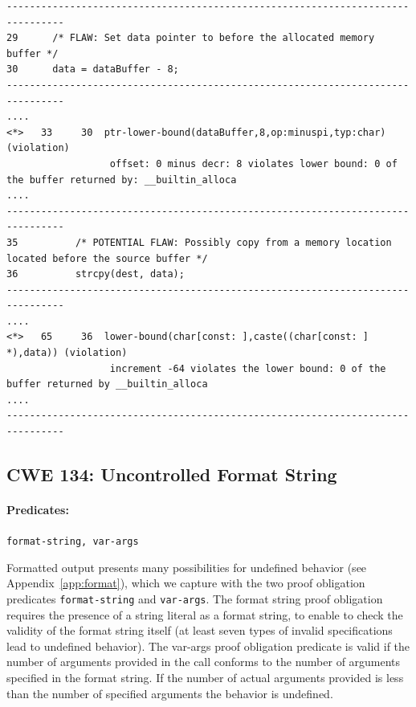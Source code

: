 \documentclass[11pt]{article}
\begin{document}
\begin{tiny}
\begin{verbatim}
--------------------------------------------------------------------------------
29      /* FLAW: Set data pointer to before the allocated memory buffer */
30      data = dataBuffer - 8;
--------------------------------------------------------------------------------
....
<*>   33     30  ptr-lower-bound(dataBuffer,8,op:minuspi,typ:char) (violation)
                  offset: 0 minus decr: 8 violates lower bound: 0 of the buffer returned by: __builtin_alloca
....
--------------------------------------------------------------------------------
35          /* POTENTIAL FLAW: Possibly copy from a memory location located before the source buffer */
36          strcpy(dest, data);
--------------------------------------------------------------------------------
....
<*>   65     36  lower-bound(char[const: ],caste((char[const: ] *),data)) (violation)
                  increment -64 violates the lower bound: 0 of the buffer returned by __builtin_alloca
....
--------------------------------------------------------------------------------
\end{verbatim}
\end{tiny}

\subsection{CWE 134: Uncontrolled Format String}

\paragraph{Predicates:} {\tt format-string, var-args}

Formatted output presents many possibilities for undefined behavior
(see Appendix~\ref{app:format}), which we capture with the two proof
obligation predicates {\tt format-string} and  {\tt  var-args}. The
format string proof obligation requires the presence of a string literal
as a format string, to enable to check the validity of the format string
itself (at least seven types of invalid specifications lead to undefined
behavior). The var-args proof obligation predicate is valid if the number
of arguments provided in the call conforms to the number of arguments
specified in the format string. If the number of actual arguments provided
is less than the number of specified arguments the behavior is undefined.
\end{document}
